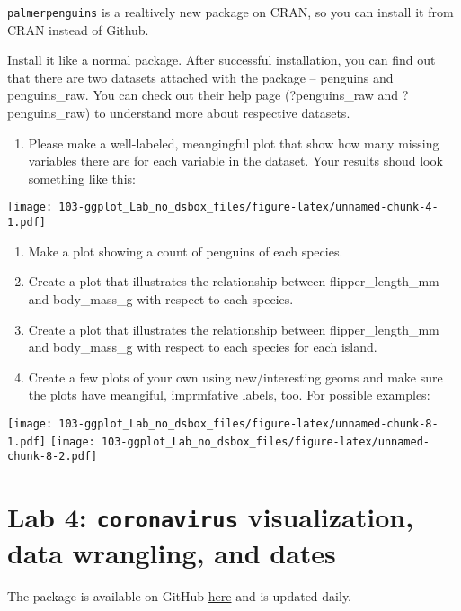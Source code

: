 \documentclass[
]{book}
\providecommand{\tightlist}{%
  \setlength{\itemsep}{0pt}\setlength{\parskip}{0pt}}
\begin{document}
\texttt{palmerpenguins} is a realtively new package on CRAN, so you can install it from CRAN instead of Github.

Install it like a normal package. After successful installation, you can find out that there are two datasets attached with the package -- penguins and penguins\_raw. You can check out their help page (?penguins\_raw and ?penguins\_raw) to understand more about respective datasets.

\begin{enumerate}
\def\labelenumi{\arabic{enumi}.}
\tightlist
\item
  Please make a well-labeled, meangingful plot that show how many missing variables there are for each variable in the dataset. Your results shoud look something like this:
\end{enumerate}

\texttt{[image: 103-ggplot\_Lab\_no\_dsbox\_files/figure-latex/unnamed-chunk-4-1.pdf]}

\begin{enumerate}
\def\labelenumi{\arabic{enumi}.}
\setcounter{enumi}{1}
\item
  Make a plot showing a count of penguins of each species.
\item
  Create a plot that illustrates the relationship between flipper\_length\_mm and body\_mass\_g with respect to each species.
\item
  Create a plot that illustrates the relationship between flipper\_length\_mm and body\_mass\_g with respect to each species for each island.
\item
  Create a few plots of your own using new/interesting geoms and make sure the plots have meangiful, imprmfative labels, too. For possible examples:
\end{enumerate}

\texttt{[image: 103-ggplot\_Lab\_no\_dsbox\_files/figure-latex/unnamed-chunk-8-1.pdf]} \texttt{[image: 103-ggplot\_Lab\_no\_dsbox\_files/figure-latex/unnamed-chunk-8-2.pdf]}

\hypertarget{lab-4-coronavirus-visualization-data-wrangling-and-dates}{%
\chapter{\texorpdfstring{Lab 4: \texttt{coronavirus} visualization, data wrangling, and dates}{Lab 4: coronavirus visualization, data wrangling, and dates}}\label{lab-4-coronavirus-visualization-data-wrangling-and-dates}}

The package is available on GitHub \href{https://github.com/RamiKrispin/coronavirus}{here} and is updated daily.
\end{document}
